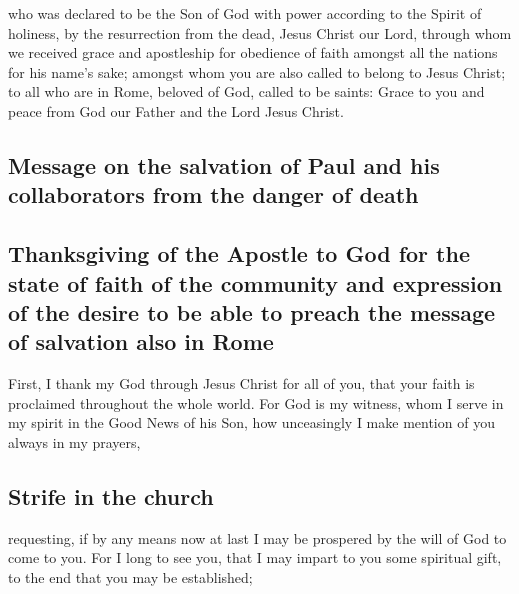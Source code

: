  who was declared to be the Son of God with power
according to the Spirit of holiness, by the resurrection from the dead,
Jesus Christ our Lord,  through whom we received grace and
apostleship for obedience of faith amongst all the nations for his
name's sake;  amongst whom you are also called to belong
to Jesus Christ;  to all who are in Rome, beloved of God,
called to be saints: Grace to you and peace from God our Father and the
Lord Jesus Christ.

\hypertarget{message-on-the-salvation-of-paul-and-his-collaborators-from-the-danger-of-death}{%
\subsection{Message on the salvation of Paul and his collaborators from
the danger of
death}\label{message-on-the-salvation-of-paul-and-his-collaborators-from-the-danger-of-death}}

\hypertarget{thanksgiving-of-the-apostle-to-god-for-the-state-of-faith-of-the-community-and-expression-of-the-desire-to-be-able-to-preach-the-message-of-salvation-also-in-rome}{%
\subsection{Thanksgiving of the Apostle to God for the state of faith of
the community and expression of the desire to be able to preach the
message of salvation also in
Rome}\label{thanksgiving-of-the-apostle-to-god-for-the-state-of-faith-of-the-community-and-expression-of-the-desire-to-be-able-to-preach-the-message-of-salvation-also-in-rome}}

 First, I thank my God through Jesus Christ for all of
you, that your faith is proclaimed throughout the whole world.
 For God is my witness, whom I serve in my spirit in the
Good News of his Son, how unceasingly I make mention of you always in my
prayers,

\hypertarget{strife-in-the-church}{%
\subsection{Strife in the church}\label{strife-in-the-church}}

 requesting, if by any means now at last I may be
prospered by the will of God to come to you.  For I long
to see you, that I may impart to you some spiritual gift, to the end
that you may be established;

